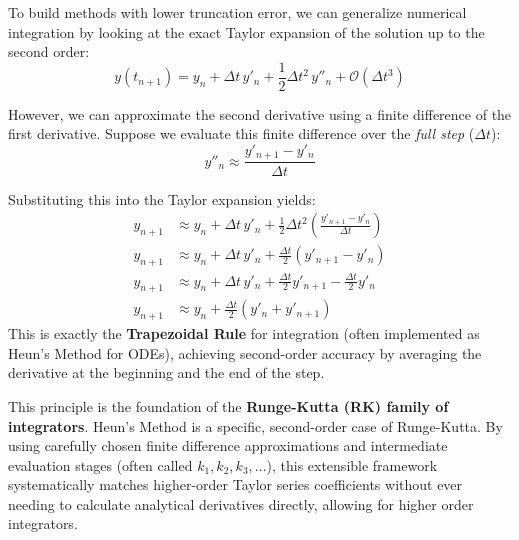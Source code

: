 \documentclass[11pt]{article}
\begin{document}
To build methods with lower truncation error, we can generalize numerical integration by looking at the exact Taylor expansion of the solution up to the second order:
\begin{equation}
    y(t_{n+1}) = y_n + \Delta t \, y'_n + \frac{1}{2}\Delta t^2 \, y''_n + \mathcal{O}(\Delta t^3)
\end{equation}

However, we can approximate the second derivative using a finite difference of the first derivative. Suppose we evaluate this finite difference over the \textit{full step} ($\Delta t$):
\begin{equation}
    y''_n \approx \frac{y'_{n+1} - y'_n}{\Delta t}
\end{equation}

Substituting this into the Taylor expansion yields:
\begin{align*}
    y_{n+1} &\approx y_n + \Delta t \, y'_n + \frac{1}{2}\Delta t^2 \left( \frac{y'_{n+1} - y'_n}{\Delta t} \right) \\
    y_{n+1} &\approx y_n + \Delta t \, y'_n + \frac{\Delta t}{2} \left( y'_{n+1} - y'_n \right) \\
    y_{n+1} &\approx y_n + \Delta t \, y'_n + \frac{\Delta t}{2} y'_{n+1} - \frac{\Delta t}{2} y'_n \\
    y_{n+1} &\approx y_n + \frac{\Delta t}{2} \left( y'_n + y'_{n+1} \right)
\end{align*}
This is exactly the \textbf{Trapezoidal Rule} for integration (often implemented as Heun's Method for ODEs), achieving second-order accuracy by averaging the derivative at the beginning and the end of the step.

\vspace{1em}
This principle is the foundation of the \textbf{Runge-Kutta (RK) family of integrators}. Heun's Method is a specific, second-order case of Runge-Kutta. By using carefully chosen finite difference approximations and intermediate evaluation stages (often called $k_1, k_2, k_3, \dots$), this extensible framework systematically matches higher-order Taylor series coefficients without ever needing to calculate analytical derivatives directly, allowing for higher order integrators.
\end{document}
